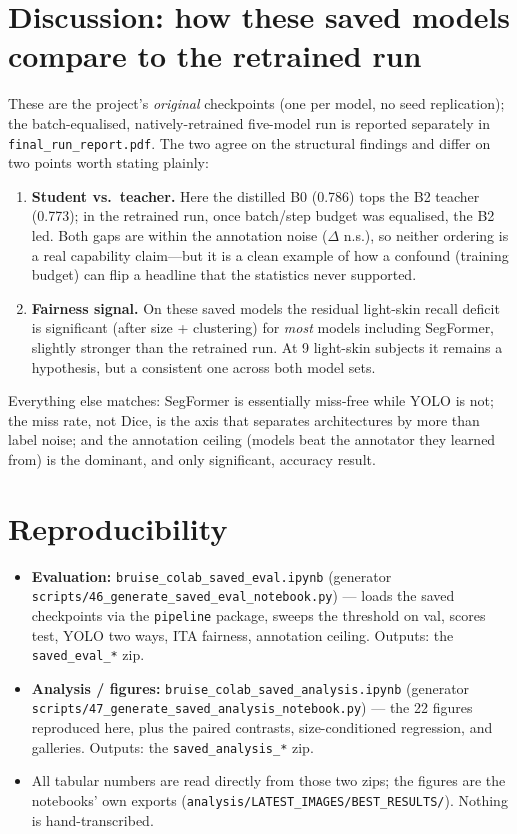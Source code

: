 \documentclass[11pt]{article}
\begin{document}
\section{Discussion: how these saved models compare to the retrained run}
These are the project's \emph{original} checkpoints (one per model, no seed replication);
the batch-equalised, natively-retrained five-model run is reported separately in
\texttt{final\_run\_report.pdf}. The two agree on the structural findings and differ on two
points worth stating plainly:
\begin{enumerate}[leftmargin=1.4em]
\item \textbf{Student vs.\ teacher.} Here the distilled B0 (0.786) tops the B2 teacher
      (0.773); in the retrained run, once batch/step budget was equalised, the B2 led. Both
      gaps are within the annotation noise ($\Delta$ n.s.), so neither ordering is a real
      capability claim---but it is a clean example of how a confound (training budget) can
      flip a headline that the statistics never supported.
\item \textbf{Fairness signal.} On these saved models the residual light-skin recall deficit
      is significant (after size + clustering) for \emph{most} models including SegFormer,
      slightly stronger than the retrained run. At 9 light-skin subjects it remains a
      hypothesis, but a consistent one across both model sets.
\end{enumerate}
Everything else matches: SegFormer is essentially miss-free while YOLO is not; the miss rate,
not Dice, is the axis that separates architectures by more than label noise; and the
annotation ceiling (models beat the annotator they learned from) is the dominant, and only
significant, accuracy result.

\section{Reproducibility}
\begin{itemize}[leftmargin=1.4em]
\item \textbf{Evaluation:} \texttt{bruise\_colab\_saved\_eval.ipynb}
      (generator \texttt{scripts/46\_generate\_saved\_eval\_notebook.py}) --- loads the saved
      checkpoints via the \texttt{pipeline} package, sweeps the threshold on val, scores test,
      YOLO two ways, ITA fairness, annotation ceiling. Outputs: the \texttt{saved\_eval\_*} zip.
\item \textbf{Analysis / figures:} \texttt{bruise\_colab\_saved\_analysis.ipynb}
      (generator \texttt{scripts/47\_generate\_saved\_analysis\_notebook.py}) --- the 22
      figures reproduced here, plus the paired contrasts, size-conditioned regression, and
      galleries. Outputs: the \texttt{saved\_analysis\_*} zip.
\item All tabular numbers are read directly from those two zips; the figures are the
      notebooks' own exports (\texttt{analysis/LATEST\_IMAGES/BEST\_RESULTS/}). Nothing is
      hand-transcribed.
\end{itemize}
\end{document}
